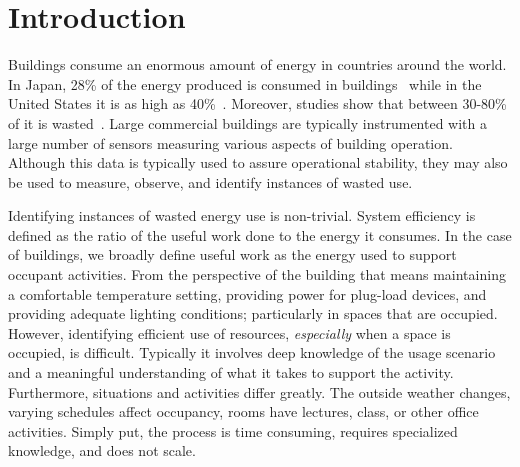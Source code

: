 \section{Introduction}
Buildings consume an enormous amount of energy in countries around the world.  In 
Japan, 28\% of the energy produced is consumed in buildings~\cite{japanbuildings} while in the United 
States it is as high as 40\%~\cite{epabuildings}.  Moreover, studies show that between 30-80\% of it
is wasted~\cite{waste_science, next10_waste}.  Large commercial buildings are typically instrumented
with a large number of sensors measuring various aspects of building operation.  Although this data is
typically used to assure operational stability, they may also be used to measure, observe, and identify
instances of wasted use.

Identifying instances of wasted energy use is non-trivial.  System efficiency is defined as the ratio of the 
useful work done to the energy it consumes.  In the case of buildings, we broadly define useful work as 
the energy used to support occupant activities.  From the perspective of the building that means maintaining
a comfortable temperature setting, providing power for plug-load devices, and providing adequate lighting
conditions; particularly in spaces that are occupied.  However, identifying efficient use of resources,
\emph{especially} when a space is occupied, is difficult.  Typically it involves deep knowledge of the usage scenario and
a meaningful understanding of what it takes to support the activity.  Furthermore, situations and activities differ
greatly.  The outside weather changes, varying schedules affect occupancy, rooms have lectures, class,
or other office activities.  Simply put, the process is time consuming, requires specialized knowledge,
and does not scale.

